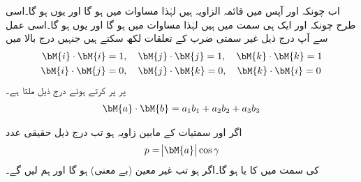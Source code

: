 اب چونکہ  اور  آپس میں قائمہ الزاویہ ہیں لہٰذا مساوات  میں  ہو گا اور یوں  ہو گا۔اسی طرح چونکہ  اور  ایک ہی سمت میں ہیں  لہٰذا مساوات  میں  ہو گا اور یوں  ہو گا۔اسی عمل سے آپ درج ذیل  غیر سمتی ضرب کے تعلقات لکھ سکتے ہیں جنہیں درج بالا میں
\begin{align}
\bM{i}\cdot\bM{i}&=1,\quad \bM{j}\cdot\bM{j}=1,\quad \bM{k}\cdot\bM{k}=1\\
\bM{i}\cdot\bM{j}&=0,\quad \bM{j}\cdot\bM{k}=0,\quad \bM{k}\cdot\bM{i}=0
\end{align}
پر پر کرتے ہوئے درج ذیل ملتا ہے۔
\begin{align}
\bM{a}\cdot \bM{b}=a_1b_1+a_2b_2+a_3b_3
\end{align}

اگر  اور   سمتیات کے مابین زاویہ  ہو تب درج ذیل حقیقی عدد
\begin{align*}
p=\abs{\bM{a}}\cos \gamma
\end{align*}
 کی سمت میں  کا  یا  ہو گا۔اگر  ہو تب  غیر معین (بے معنی) ہو گا اور ہم  لیں گے۔

